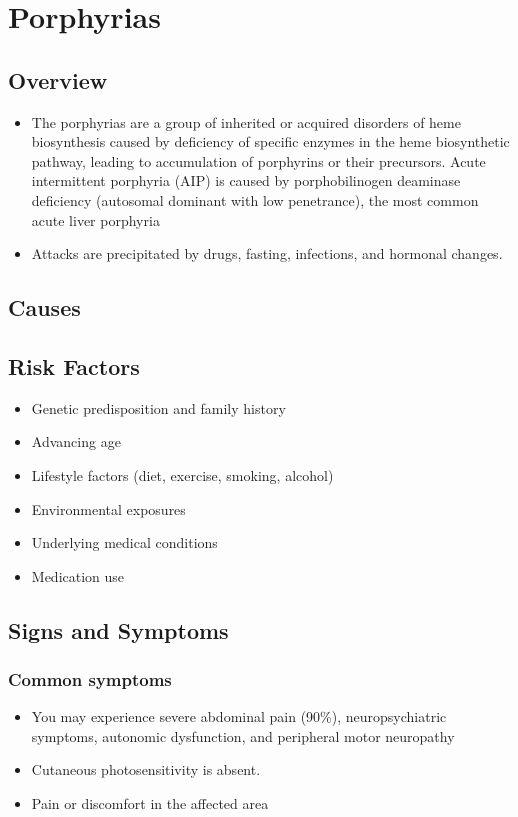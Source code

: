 \chapter{Porphyrias}
\label{sec:Porphyrias}

\section{Overview}


\begin{itemize}[noitemsep]
  \item The porphyrias are a group of inherited or acquired disorders of heme biosynthesis caused by deficiency of specific enzymes in the heme biosynthetic pathway, leading to accumulation of porphyrins or their precursors. Acute intermittent porphyria (AIP) is caused by porphobilinogen deaminase deficiency (autosomal dominant with low penetrance), the most common acute liver porphyria
  \item Attacks are precipitated by drugs, fasting, infections, and hormonal changes.
\end{itemize}
\section{Causes}
\section{Risk Factors}

\begin{itemize}[noitemsep]
  \item Genetic predisposition and family history
  \item Advancing age
  \item Lifestyle factors (diet, exercise, smoking, alcohol)
  \item Environmental exposures
  \item Underlying medical conditions
  \item Medication use
\end{itemize}
\section{Signs and Symptoms}

\subsection{Common symptoms}
\begin{itemize}[noitemsep]
  \item You may experience severe abdominal pain (90\%), neuropsychiatric symptoms, autonomic dysfunction, and peripheral motor neuropathy
  \item Cutaneous photosensitivity is absent.
  \item Pain or discomfort in the affected area
  \end{itemize}

